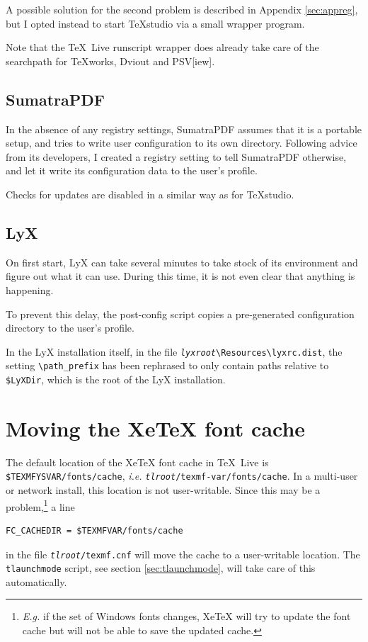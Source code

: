 \documentclass[11pt,a4paper,oneside]{report}
\def\TL{\TeX~Live}
\def\TS{TeXstudio}
\def\XeTeX{Xe\TeX}
\def\dbr{\discretionary{}{}{}}
\let\bsl\textbackslash
\def\bslb{\bsl\discretionary{}{}{}}
\begin{document}
A possible solution for the second problem is described in Appendix
\ref{sec:appreg}, but I opted instead to start \TS{} via a small
wrapper program.

Note that the \TL{} runscript wrapper does already take care of the
searchpath for TeXworks, Dviout and PSV[iew].

\subsection{SumatraPDF}
\label{sec:sumatra}

In the absence of any registry settings, SumatraPDF assumes that it
is a portable setup, and tries to write user configuration to its
own directory. Following advice from its developers, I created a
registry setting to tell SumatraPDF otherwise, and let it write
its configuration data to the user's profile.

Checks for updates are disabled in a similar way as for \TS.

\subsection{LyX}
\label{sec:lyx}

On first start, LyX can take several minutes to take stock of its
environment and figure out what it can use. During this time, it is not
even clear that anything is happening.

To prevent this delay, the post-config script copies a pre-generated
configuration directory to the user's profile.

In the LyX installation itself, in the file
\texttt{\emph{lyxroot}\bslb Resources\bslb lyxrc.dist}, the setting
\texttt{\bsl path\_prefix} has been rephrased to only contain paths
relative to \texttt{\$LyXDir}, which is the root of the LyX
installation.

\section{Moving the \XeTeX{} font cache}
\label{sec:xecache}

The default location of the \XeTeX{} font cache in \TL{} is
\texttt{\$TEXMFYSVAR/\dbr fonts/\dbr cache}, \emph{i.e.}
\texttt{\emph{tlroot}/\dbr texmf-var/\dbr fonts/\dbr cache}. In a
multi-user or network install, this location is not
user-writable. Since this may be a problem,\footnote{\emph{E.g.} if
  the set of Windows fonts changes, \XeTeX{} will try to update the
  font cache but will not be able to save the updated cache.} a line
\begin{verbatim}
FC_CACHEDIR = $TEXMFVAR/fonts/cache
\end{verbatim}
in the file \texttt{\emph{tlroot}/\dbr texmf.cnf} will move the
cache to a user-writable location. The \texttt{tlaunchmode} script,
see section \ref{sec:tlaunchmode}, will take care of this
automatically.
\end{document}
